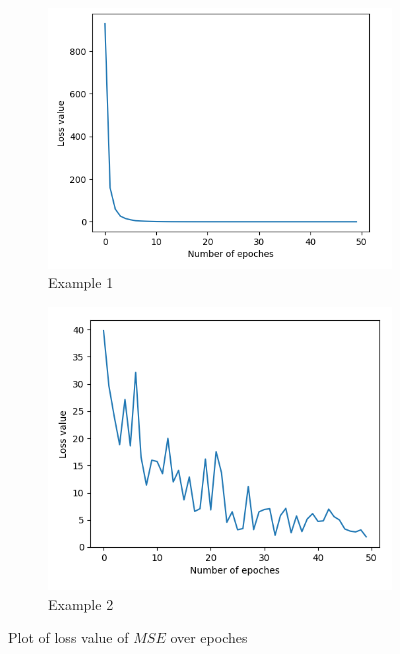 \documentclass[11pt,a4paper]{IEEEtran}
\begin{document}
\begin{figure}[!hbt]
	\begin{subfigure}[b]{0.43\textwidth}
		\includegraphics[width=\textwidth]{examples/1/loss.png}
		\caption{Example 1}
		\label{fig:loss1:1}
	\end{subfigure}
	\begin{subfigure}[b]{0.43\textwidth}
		\includegraphics[width=\textwidth]{examples/2/loss.png}
		\caption{Example 2}
		\label{fig:loss1:2}
	\end{subfigure}
	\caption{Plot of loss value of $MSE$ over epoches}
	\label{fig:loss1}
\end{figure}
\end{document}
